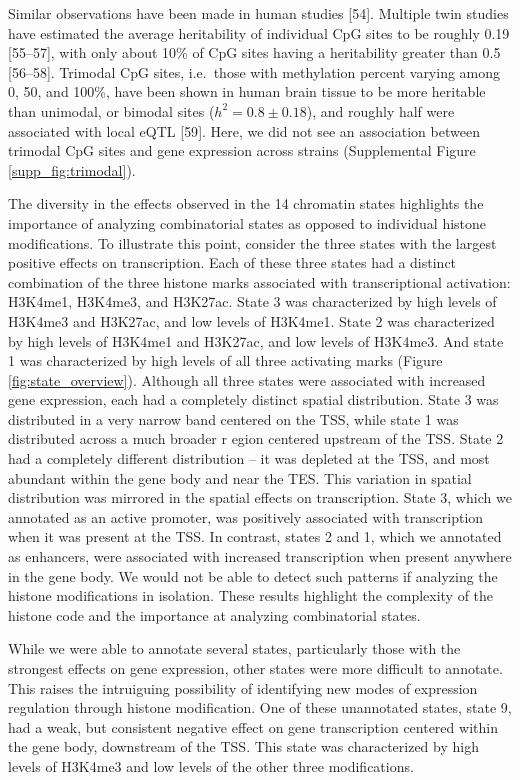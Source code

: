 \documentclass[10pt,letterpaper]{article}
\begin{document}
Similar observations have been made in human studies {[}54{]}. Multiple
twin studies have estimated the average heritability of individual CpG
sites to be roughly 0.19 {[}55--57{]}, with only about 10\% of CpG sites
having a heritability greater than 0.5 {[}56--58{]}. Trimodal CpG sites,
i.e.~those with methylation percent varying among 0, 50, and 100\%, have
been shown in human brain tissue to be more heritable than unimodal, or
bimodal sites (\(h^2 = 0.8 \pm 0.18\)), and roughly half were associated
with local eQTL {[}59{]}. Here, we did not see an association between
trimodal CpG sites and gene expression across strains (Supplemental
Figure \ref{supp_fig:trimodal}).

The diversity in the effects observed in the 14 chromatin states
highlights the importance of analyzing combinatorial states as opposed
to individual histone modifications. To illustrate this point, consider
the three states with the largest positive effects on transcription.
Each of these three states had a distinct combination of the three
histone marks associated with transcriptional activation: H3K4me1,
H3K4me3, and H3K27ac. State 3 was characterized by high levels of
H3K4me3 and H3K27ac, and low levels of H3K4me1. State 2 was
characterized by high levels of H3K4me1 and H3K27ac, and low levels of
H3K4me3. And state 1 was characterized by high levels of all three
activating marks (Figure \ref{fig:state_overview}). Although all three
states were associated with increased gene expression, each had a
completely distinct spatial distribution. State 3 was distributed in a
very narrow band centered on the TSS, while state 1 was distributed
across a much broader r egion centered upstream of the TSS. State 2 had
a completely different distribution -- it was depleted at the TSS, and
most abundant within the gene body and near the TES. This variation in
spatial distribution was mirrored in the spatial effects on
transcription. State 3, which we annotated as an active promoter, was
positively associated with transcription when it was present at the TSS.
In contrast, states 2 and 1, which we annotated as enhancers, were
associated with increased transcription when present anywhere in the
gene body. We would not be able to detect such patterns if analyzing the
histone modifications in isolation. These results highlight the
complexity of the histone code and the importance at analyzing
combinatorial states.

While we were able to annotate several states, particularly those with
the strongest effects on gene expression, other states were more
difficult to annotate. This raises the intruiguing possibility of
identifying new modes of expression regulation through histone
modification. One of these unannotated states, state 9, had a weak, but
consistent negative effect on gene transcription centered within the
gene body, downstream of the TSS. This state was characterized by high
levels of H3K4me3 and low levels of the other three modifications.
\end{document}
